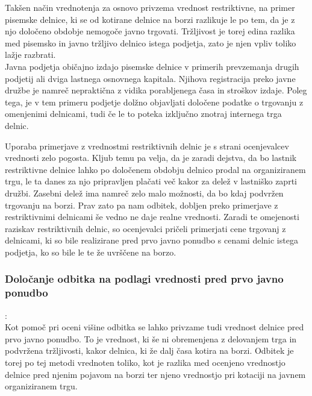\documentclass[12pt,a4paper]{amsart}
\theoremstyle{definition} %
\theoremstyle{plain} %
\begin{document}
Takšen način vrednotenja za osnovo privzema vrednost restriktivne, na primer pisemske delnice, ki se od kotirane delnice na borzi razlikuje le po tem, da je z njo določeno obdobje nemogoče javno trgovati. Tržljivost je torej edina razlika med pisemsko in javno tržljivo delnico istega podjetja, zato je njen vpliv toliko lažje razbrati.\\
Javna podjetja običajno izdajo pisemske delnice v primerih prevzemanja drugih podjetij ali dviga lastnega osnovnega kapitala. Njihova registracija preko javne družbe je namreč nepraktična z vidika porabljenega časa in stroškov izdaje. Poleg tega, je v tem primeru podjetje dolžno objavljati določene podatke o trgovanju z omenjenimi delnicami, tudi če le to poteka izključno znotraj internega trga delnic. \par
Uporaba primerjave z vrednostmi restriktivnih delnic je s strani ocenjevalcev vrednosti zelo pogosta. Kljub temu pa velja, da je zaradi dejstva, da bo lastnik restriktivne delnice lahko po določenem obdobju delnico prodal na organiziranem trgu, le ta danes za njo pripravljen plačati več kakor za delež v lastniško zaprti družbi. Zasebni delež ima namreč zelo malo možnosti, da bo kdaj podvržen trgovanju na borzi. Prav zato pa nam odbitek, dobljen preko primerjave z restriktivnimi delnicami še vedno ne daje realne vrednosti. Zaradi te omejenosti raziskav restriktivnih delnic, so ocenjevalci pričeli primerjati cene trgovanj z delnicami, ki so bile realizirane pred prvo javno ponudbo s cenami delnic istega podjetja, ko so bile le te že uvrščene na borzo.

\subsubsection{Določanje odbitka na podlagi vrednosti pred prvo javno ponudbo}:\\

Kot pomoč pri oceni višine odbitka se lahko privzame tudi vrednost delnice pred prvo javno ponudbo. To je vrednost, ki še ni obremenjena z delovanjem trga in podvržena tržljivosti, kakor delnica, ki že dalj časa kotira na borzi. Odbitek je torej po tej metodi vrednoten toliko, kot je razlika med ocenjeno vrednostjo delnice pred njenim pojavom na borzi ter njeno vrednostjo pri kotaciji na javnem organiziranem trgu.  \\
\end{document}
